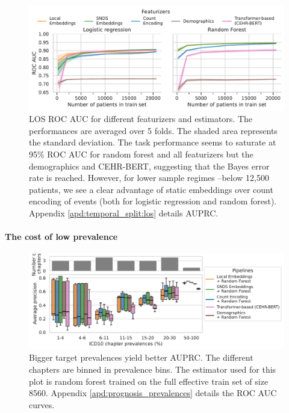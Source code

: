 \documentclass[french,12pt,twoside,a4paper]{book}
\begin{document}
\begin{figure}[!h]
  \centering
  \includegraphics[width=0.9\linewidth]{img/chapter_3/los/roc_auc_score_performances.pdf}
  \caption{LOS ROC AUC for different featurizers and estimators. The
    performances are averaged over 5 folds. The shaded area represents the
    standard deviation. The task performance seems to saturate at 95\% ROC AUC
    for random forest and all featurizers but the demographics and CEHR-BERT,
    suggesting that the Bayes error rate is reached. However, for lower sample
    regimes --below 12,500 patients, we see a clear advantage of static
    embeddings over count encoding of events (both for logistic regression and
    random forest). Appendix \ref{apd:temporal_split:los} details AUPRC.}%
  \label{fig:los_roc_auc}
\end{figure}


\paragraph{The cost of low prevalence}

\begin{figure}[!b]
  \centering
  \includegraphics[width=1\linewidth]{img/chapter_3/prognosis/prevalence_results__est_random_forests_boxplot_average_precision_score_xlog.pdf}
  \caption{ Bigger target prevalences yield better AUPRC. The
    different chapters are binned in prevalence bins. The estimator used for
    this plot is random forest trained on the full effective train set of size
    8560. Appendix \ref{apd:prognosis_prevalences} details the ROC AUC curves.}%
  \label{fig:prognosis_prevalences_auprc}
\end{figure}
\end{document}
